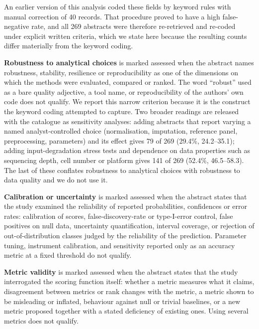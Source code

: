 \documentclass[11pt]{article}
\begin{document}
An earlier version of this analysis coded these fields by keyword rules
with manual correction of 40 records. That procedure proved to have a
high false-negative rate, and all 269 abstracts were therefore
re-retrieved and re-coded under explicit written criteria, which we
state here because the resulting counts differ materially from the
keyword coding.

\textbf{Robustness to analytical choices} is marked assessed when the
abstract names robustness, stability, resilience or reproducibility as
one of the dimensions on which the methods were evaluated, compared or
ranked. The word ``robust'' used as a bare quality adjective, a tool
name, or reproducibility of the authors' own code does not qualify. We
report this narrow criterion because it is the construct the keyword
coding attempted to capture. Two broader readings are released with the
catalogue as sensitivity analyses: adding abstracts that report varying
a named analyst-controlled choice (normalisation, imputation, reference
panel, preprocessing, parameters) and its effect gives 79 of 269
(29.4\%, 24.2--35.1); adding input-degradation stress tests and
dependence on data properties such as sequencing depth, cell number or
platform gives 141 of 269 (52.4\%, 46.5--58.3). The last of these
conflates robustness to analytical choices with robustness to data
quality and we do not use it.

\textbf{Calibration or uncertainty} is marked assessed when the abstract
states that the study examined the reliability of reported
probabilities, confidences or error rates: calibration of scores,
false-discovery-rate or type-I-error control, false positives on null
data, uncertainty quantification, interval coverage, or rejection of
out-of-distribution classes judged by the reliability of the prediction.
Parameter tuning, instrument calibration, and sensitivity reported only
as an accuracy metric at a fixed threshold do not qualify.

\textbf{Metric validity} is marked assessed when the abstract states
that the study interrogated the scoring function itself: whether a
metric measures what it claims, disagreement between metrics or rank
changes with the metric, a metric shown to be misleading or inflated,
behaviour against null or trivial baselines, or a new metric proposed
together with a stated deficiency of existing ones. Using several
metrics does not qualify.
\end{document}
